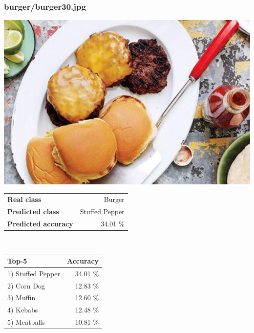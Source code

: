 \subsubsection{burger/burger30.jpg}

\begin{minipage}[t]{0.4\textwidth}
	\vspace{0pt}
	\includegraphics[width=\linewidth]{images/evaluation-images/burger/burger30.jpg}
\end{minipage}
\hfill
\begin{minipage}[t]{0.5\textwidth}
	\vspace{0pt}\raggedright
	\begin{tabularx}{\textwidth}{X r}
		\small \textbf{Real class} & \small Burger\\
		\small \textbf{Predicted class} & \small Stuffed Pepper\\
		\small \textbf{Predicted accuracy} & \small 34.01 \%
    \end{tabularx}\\
    
    \vspace{6pt}
	\begin{tabularx}{\textwidth}{X r}
        \small \textbf{Top-5} & \small \textbf{Accuracy} \\
        \hline
		\small 1) Stuffed Pepper & \small 34.01 \%\\\small 2) Corn Dog & \small 12.83 \%\\\small 3) Muffin & \small 12.60 \%\\\small 4) Kebabs & \small 12.48 \%\\\small 5) Meatballs & \small 10.81 \%
    \end{tabularx}
\end{minipage}
    

